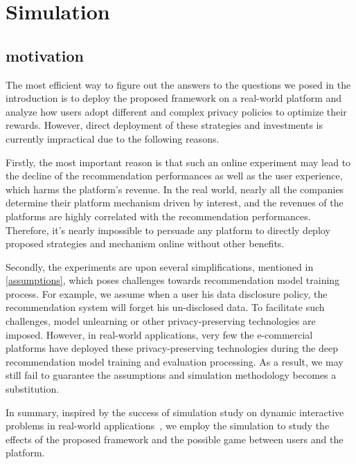 \section{Simulation}

\subsection{motivation} %
The most efficient way to figure out the answers to the questions we posed in the introduction is to deploy the proposed framework on a real-world platform and analyze how users adopt different and complex privacy policies to optimize their rewards.
However, direct deployment of these strategies and investments is currently impractical due to the following reasons.


Firstly, the most important reason is that such an online experiment may lead to the decline of the recommendation performances as well as the user experience, which harms the platform's revenue.
In the real world, nearly all the companies determine their platform mechanism driven by interest, and the revenues of the platforms are highly correlated with the recommendation performances. 
Therefore, it's nearly impossible to persuade any platform to directly deploy proposed strategies and mechanism online without other benefits.  



Secondly, the experiments are  upon several simplifications, mentioned in \cref{assumptions}, which poses challenges towards recommendation model training process.
For example, we assume when a user  his data disclosure policy, the recommendation system will forget his un-disclosed data. 
To facilitate such challenges, model unlearning or other privacy-preserving technologies are imposed.
However, in real-world applications, very few the e-commercial platforms have deployed these privacy-preserving technologies during the deep recommendation model training and evaluation processing.
As a result, we may still fail to guarantee the assumptions and simulation methodology becomes a substitution.










In summary, inspired by the success of simulation study on dynamic interactive problems in real-world applications~\cite{Ie:arxiv19:RecSim,krauth2020offline,lucherini2021t,yao2021measuring},  we employ the simulation to study the effects of the proposed framework and the possible game between users and the platform.















